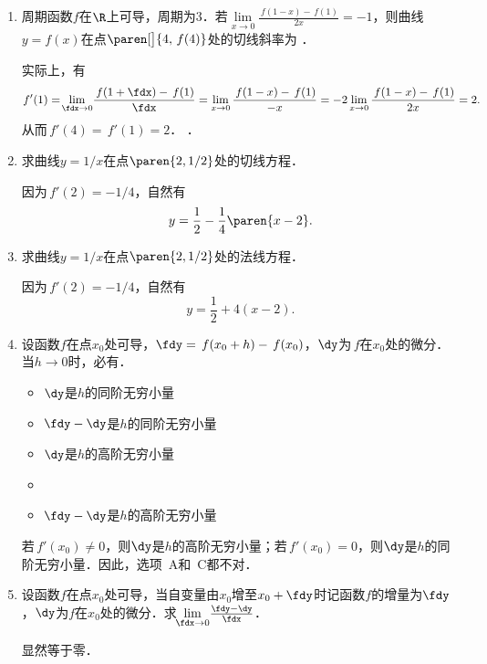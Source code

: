 \begin{enumerate}
\item 周期函数\(f\)在\(\R\)上可导，周期为\(3\)．若\(\lim\limits_{x\to0} \frac{\,f(1-x)-\,f(1)}{2x} = -1\)，则曲线\(y = f(x)\)在点\(\paren[\big]{4, \,f(4)}\)处的切线斜率为
  \ifshowsol
  \uline{}．

  实际上，有
  \begin{equation*}
    f'(1)
    = \!\lim_{\fdx\to0} \!\frac{\,f(1+\fdx) - \,f(1)}{\fdx}
    = \lim_{x\to0} \frac{\,f(1-x) - \,f(1)}{-x}
    = -2 \lim_{x\to0} \frac{\,f(1-x)-\,f(1)}{2x}
    = 2.
  \end{equation*}
  从而\(\,f'(4) = \,f'(1) = 2\)．
  \else
  \uline{\hspace{4em}}．
  \fi

\item 求曲线\(y = 1/x\)在点\(\paren{2,1/2}\)处的切线方程．

  \ifshowsol
  因为\(\,f'(2) = -1/4\)，自然有
  \begin{equation*}
    y = \frac12 - \frac14 \paren{x-2}.
  \end{equation*}
  \fi

\item 求曲线\(y = 1/x\)在点\(\paren{2,1/2}\)处的法线方程．

  \ifshowsol
  因为\(\,f'(2) = -1/4\)，自然有
  \begin{equation*}
    y = \frac12 + 4(x-2).
  \end{equation*}
  \fi

\item 设函数\(f\)在点\(x_0\)处可导，\(\fdy = \,f(x_0+h) - \,f(x_0)\)，\(\dy\)为\(\,f\)在\(x_0\)处的微分．当\(h \to 0\)时，必有\uline{\hspace*{6em}}．
  \begin{itemize}
    \renewcommand{\labelitemi}{\faCircleThin}
  \item \(\dy\)是\(h\)的同阶无穷小量
  \item \(\fdy - \dy\)是\(h\)的同阶无穷小量
  \item \(\dy\)是\(h\)的高阶无穷小量
    \ifshowsol
  \item[\faCircle]
    \else
  \item
    \fi
    \(\fdy - \dy\)是\(h\)的高阶无穷小量
  \end{itemize}

  \ifshowsol
  若\(\,f'(x_0) \ne 0\)，则\(\dy\)是\(h\)的高阶无穷小量；若\(\,f'(x_0) = 0\)，则\(\dy\)是\(h\)的同阶无穷小量．因此，选项~A和~C都不对．
  \fi

\item 设函数\(f\)在点\(x_0\)处可导，当自变量由\(x_0\)增至\(x_0+\fdy\)时记函数\(f\)的增量为\(\fdy\)，\(\dy\)为\(f\)在\(x_0\)处的微分．求\(\!\lim\limits_{\fdx\to0} \!\frac{\fdy - \dy}{\fdx}\)．

  \ifshowsol
  显然等于零．
  \fi
\end{enumerate}
\fi

